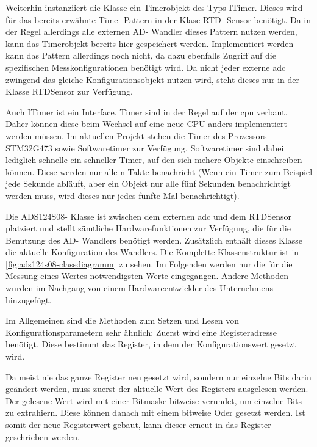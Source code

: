 Weiterhin instanziiert die Klasse ein Timerobjekt des Typs ITimer.
Dieses wird für das bereits erwähnte Time- Pattern in der Klase RTD- Sensor benötigt.
Da in der Regel allerdings alle externen AD- Wandler dieses Pattern nutzen werden, kann das Timerobjekt bereits hier gespeichert werden.
Implementiert werden kann das Pattern allerdings noch nicht, da dazu ebenfalls Zugriff auf die spezifischen Messkonfigurationen benötigt wird.
Da nicht jeder externe \ac{adc} zwingend das gleiche Konfigurationsobjekt nutzen wird, steht dieses nur in der Klasse RTDSensor zur Verfügung.

Auch ITimer ist ein Interface.
Timer sind in der Regel auf der \ac{cpu} verbaut.
Daher können diese beim Wechsel auf eine neue CPU anders implementiert werden müssen.
Im aktuellen Projekt stehen die Timer des Prozessors STM32G473 sowie Softwaretimer zur Verfügung.
Softwaretimer sind dabei lediglich schnelle ein schneller Timer, auf den sich mehere Objekte einschreiben können.
Diese werden nur alle n Takte benachricht (Wenn ein Timer zum Beispiel jede Sekunde abläuft, aber ein Objekt nur alle fünf Sekunden benachrichtigt werden muss, wird dieses nur jedes fünfte Mal benachrichtigt).

Die ADS124S08- Klasse ist zwischen dem externen \ac{adc} und dem RTDSensor platziert und stellt sämtliche Hardwarefunktionen zur Verfügung, die für die Benutzung des AD- Wandlers benötigt werden.
Zusätzlich enthält dieses Klasse die aktuelle Konfiguration des Wandlers.
Die Komplette Klassenstruktur ist in \autoref{fig:ads124s08-classdiagramm} zu sehen.\newline
Im Folgenden werden nur die für die Messung eines Wertes notwendigsten Werte eingegangen.
Andere Methoden wurden im Nachgang von einem Hardwareentwickler des Unternehmens hinzugefügt.

Im Allgemeinen sind die Methoden zum Setzen und Lesen von Konfigurationsparametern sehr ähnlich:
Zuerst wird eine Registeradresse benötigt. Diese bestimmt das Register, in dem der Konfigurationswert gesetzt wird.

Da meist nie das ganze Register neu gesetzt wird, sondern nur einzelne Bits darin geändert werden, muss zuerst der aktuelle Wert des Registers ausgelesen werden.
Der gelesene Wert wird mit einer Bitmaske bitweise verundet, um einzelne Bits zu extrahiern.
Diese können danach mit einem bitweise Oder gesetzt werden.\newline
Ist somit der neue Registerwert gebaut, kann dieser erneut in das Register geschrieben werden.


